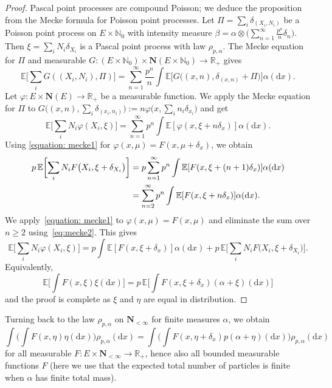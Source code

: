 \documentclass[10pt,a4paper]{amsart}
\numberwithin{equation}{section}
\newcommand{\N}{\mathbb{N}}
\newcommand{\R}{\mathbb{R}}
\newcommand{\E}{\mathbb{E}}
\newcommand{\dd}{\mathrm{d}} %
\newcommand{\1}{\mathbbm{1}}
\begin{document}
\begin{proof}
	Pascal point processes are compound Poisson; we deduce the proposition from the Mecke formula for Poisson point processes. Let $\Pi = \sum_i \delta_{(X_i,N_i)}$ be a Poisson point process on $E\times \N_0$ with intensity measure $\beta = \alpha\otimes \bigl(\sum_{n=1}^\infty \frac{p^n}{n} \delta_n\bigr)$. Then $\xi = \sum_i N_i \delta_{X_i}$ is a Pascal point process with law $\rho_{p,\alpha}$. The Mecke equation for $\Pi$ \cite[Theorem 4.1]{LastPenroseLecturesOnThePoissonProcess} and measurable $G\colon (E\times \N_0)\times \mathbf N(E\times \N_0) \to \R_+$ gives
\[
	\E\biggl[ \sum_i G( (X_i, N_i), \Pi )\biggr] = \sum_{n=1}^\infty \frac{p^n}{n} \int \E\bigl[ G\bigl( (x,n), \delta_{(x,n)} + \Pi\bigr) \bigr] \alpha (\dd x).
\]
Let $\varphi\colon E\times \mathbf N(E)\to \R_+$ be a measurable function. We apply the Mecke equation for $\Pi$ to $G\bigl((x,n),\sum_i \delta_{(x_i,n_i)}\bigr):= n \varphi\bigl(x, \sum_i n_i \delta_{x_i}\bigr)$ and get
\begin{equation}
 \label{equation: mecke1}
	\E\biggl[\sum_i N_i \varphi( X_i, \xi)\biggr] = \sum_{n=1}^\infty p^n \int \E[ \varphi(x, \xi+ n \delta_x)] \alpha(\dd x).
\end{equation}
Using \eqref{equation: mecke1} for $\varphi(x,\mu) = F(x,\mu + \delta_x)$, we obtain
\begin{align}
 p\, \E \biggl[ \sum_i N_i F\bigl( X_i, \xi +\delta_{X_i}\bigr)\biggr] &= p\sum_{n=1}^\infty p^n \int \E [ F(x, \xi + (n+1) \delta_{x}) ]\alpha(\dd x) \notag \\
 &= \sum_{n=2}^\infty p^n \int \E [ F(x, \xi + n \delta_{x}) ] \alpha(\dd x). \label{eq:mecke2}
\end{align}
We apply~\eqref{equation: mecke1} to $\varphi(x,\mu) = F(x,\mu)$ and eliminate the sum over $n\geq 2$ using~\eqref{eq:mecke2}. This gives
\begin{equation*}
	\E\biggl[\sum_i N_i \varphi( X_i, \xi)\biggr] =
		p \int \E[ F(x, \xi+ \delta_x)] \alpha(\dd x) + p\, \E \biggl[ \sum_i N_i F\bigl( X_i, \xi +\delta_{X_i}\bigr)\biggr].
\end{equation*}
Equivalently,
\[
	\E\biggl[ \int F(x,\xi) \xi(\dd x)\biggr] = p\, \E\biggl[ \int F(x, \xi+\delta_x) (\alpha + \xi)(\dd x)\biggr]
\]
and the proof is complete as $\xi$ and $\eta$ are equal in distribution.
\end{proof}

Turning back to the law $\rho_{p,\alpha}$ on $\mathbf N_{<\infty}$ for finite measures $\alpha$, we obtain
\begin{equation} \label{eq:papangelou}
	\int \biggl( \int F(x,\eta)\eta(\dd x)\biggr) \rho_{p,\alpha}(\dd x)
	= \int\biggl( \int F(x,\eta+\delta_x) p (\alpha+\eta)(\dd x)\biggr) \rho_{p,\alpha}(\dd x)
\end{equation}
for all measurable $F\colon E\times \mathbf N_{<\infty}\to \R_+$, hence also all bounded measurable functions $F$ (here we use that the expected total number of particles is finite when $\alpha$ has finite total mass).
\end{document}
